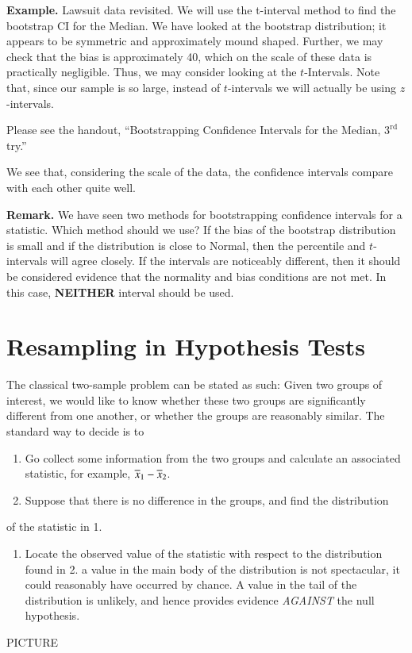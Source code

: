 \documentclass[captions=tableheading]{scrbook}
\begin{document}
\textbf{Example.} Lawsuit data revisited. We will use the t-interval method to find the bootstrap CI for the Median. We have looked at the bootstrap distribution; it appears to be symmetric and approximately mound shaped. Further, we may check that the bias is approximately 40, which on the scale of these data is practically negligible. Thus, we may consider looking at the $t$-Intervals. Note that, since our sample is so large, instead of $t$-intervals we will actually be using $z$-intervals.

 

Please see the handout, ``Bootstrapping Confidence Intervals for the Median, $3^{\mathrm{rd}}$ try.''

 

We see that, considering the scale of the data, the confidence intervals compare with each other quite well.

 
\textbf{Remark.} We have seen two methods for bootstrapping confidence intervals for a statistic. Which method should we use? If the bias of the bootstrap distribution is small and if the distribution is close to Normal, then the percentile and $t$-intervals will agree closely. If the intervals are noticeably different, then it should be considered evidence that the normality and bias conditions are not met. In this case, \textbf{NEITHER} interval should be used.
\section{Resampling in Hypothesis Tests}
\label{sec-5_5}


The classical two-sample problem can be stated as such: Given two groups of interest, we would like to know whether these two groups are significantly different from one another, or whether the groups are reasonably similar. The standard way to decide is to


\begin{enumerate}
\item Go collect some information from the two groups and calculate an associated statistic, for example, $\overline{x}_{1}-\overline{x}_{2}$.
\item Suppose that there is no difference in the groups, and find the distribution
\end{enumerate}
of the statistic in 1. 


\begin{enumerate}
\item Locate the observed value of the statistic with respect to the distribution found in 2. a value in the main body of the distribution is not spectacular, it could reasonably have occurred by chance. A value in the tail of the distribution is unlikely, and hence provides evidence \emph{AGAINST} the null hypothesis.
\end{enumerate}
PICTURE
\end{document}
